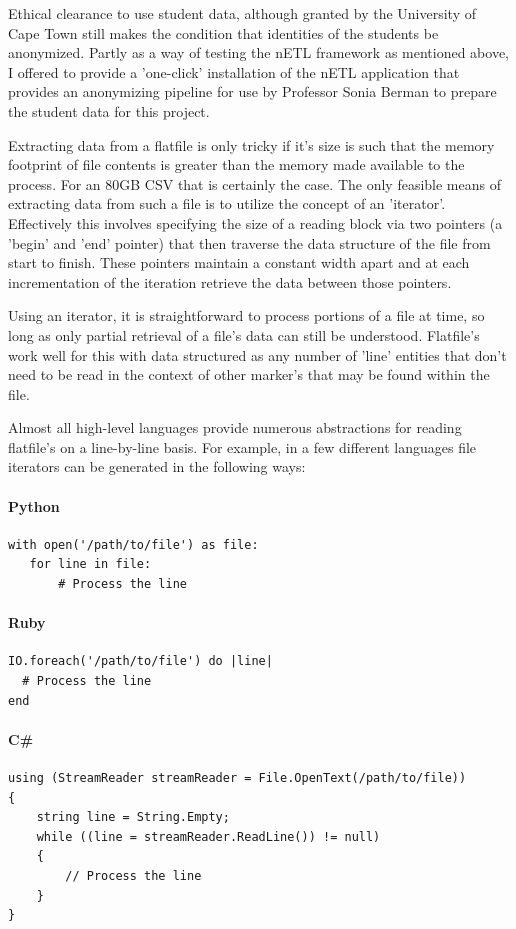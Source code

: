 Ethical clearance to use student data, although granted by the University of Cape Town still makes the condition that identities of the students be anonymized. Partly as a way of testing the nETL framework as mentioned above, I offered to provide a 'one-click' installation of the nETL application that provides an anonymizing pipeline for use by Professor Sonia Berman to prepare the student data for this project.

Extracting data from a flatfile is only tricky if it's size is such that the memory footprint of file contents is greater than the memory made available to the process. For an 80GB CSV that is certainly the case. The only feasible means of extracting data from such a file is to utilize the concept of an 'iterator'. Effectively this involves specifying the size of a reading block via two pointers (a 'begin' and 'end' pointer) that then traverse the data structure of the file from start to finish. These pointers maintain a constant width apart and at each incrementation of the iteration retrieve the data between those pointers.

Using an iterator, it is straightforward to process portions of a file at time, so long as only partial retrieval of a file's data can still be understood. Flatfile's work well for this with data structured as any number of 'line' entities that don't need to be read in the context of other marker's that may be found within the file.

Almost all high-level languages provide numerous abstractions for reading flatfile's on a line-by-line basis. For example, in a few different languages file iterators can be generated in the following ways:

\paragraph*{Python}
\begin{verbatim}
with open('/path/to/file') as file:
   for line in file:
       # Process the line
\end{verbatim}

\paragraph*{Ruby}
\begin{verbatim}
IO.foreach('/path/to/file') do |line|
  # Process the line
end
\end{verbatim}

\paragraph*{C\#}
\begin{verbatim}
using (StreamReader streamReader = File.OpenText(/path/to/file))
{
    string line = String.Empty;
    while ((line = streamReader.ReadLine()) != null)
    {
        // Process the line
    }
}
\end{verbatim}

